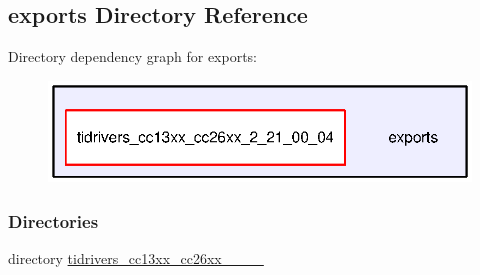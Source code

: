 \subsection{exports Directory Reference}
\label{dir_095234140163703c8fbbd1baa1c60e2a}
Directory dependency graph for exports\+:
\nopagebreak
\begin{figure}[H]
\begin{center}
\leavevmode
\includegraphics[width=325pt]{dir_095234140163703c8fbbd1baa1c60e2a_dep}
\end{center}
\end{figure}
\subsubsection*{Directories}
\begin{DoxyCompactItemize}
\item 
directory \hyperlink{dir_ffec4c53c499197dc1aac9a345d4fe6c}{tidrivers\+\_\+cc13xx\+\_\+cc26xx\+\_\+\_\+\_\+\_}
\end{DoxyCompactItemize}
